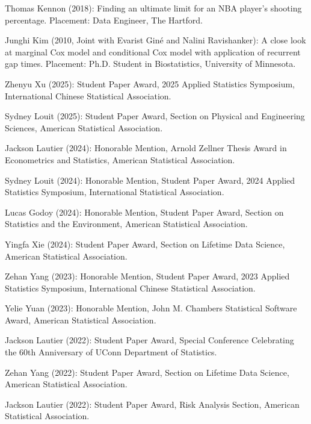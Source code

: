 \documentclass[Statistics]{vita}
\begin{document}
\begin{vita}
\begin{Students}
\begin{UndergraduateHonor}
    \item Thomas Kennon (2018): Finding an ultimate limit for an NBA player's shooting percentage. Placement: Data Engineer, The Hartford.
    \item Junghi Kim (2010, Joint with Evarist Gin\'e and Nalini Ravishanker): A close look at marginal Cox model and conditional Cox model with application of recurrent gap times. Placement: Ph.D. Student in Biostatistics, University of Minnesota.
    \end{UndergraduateHonor}
  \end{Students}
  \begin{TeachingAccomplishments}
    \begin{StudentAwards}
    \item Zhenyu Xu (2025): Student Paper Award, 2025 Applied Statistics Symposium, International Chinese Statistical Association.
    \item Sydney Louit (2025): Student Paper Award, Section on Physical and Engineering Sciences, American Statistical Association.
    \item Jackson Lautier (2024): Honorable Mention, Arnold Zellner Thesis Award in Econometrics and Statistics, American Statistical Association.
    \item Sydney Louit (2024): Honorable Mention, Student Paper Award, 2024 Applied Statistics Symposium, International Statistical Association.
    \item Lucas Godoy (2024): Honorable Mention, Student Paper Award, Section on Statistics and the Environment, American Statistical Association.
    \item Yingfa Xie (2024): Student Paper Award, Section on Lifetime Data Science, American Statistical Association.
    \item Zehan Yang (2023): Honorable Mention, Student Paper Award, 2023 Applied Statistics Symposium, International Chinese Statistical Association.
    \item Yelie Yuan (2023): Honorable Mention, John M. Chambers Statistical Software Award, American Statistical Association.
    \item Jackson Lautier (2022): Student Paper Award, Special Conference Celebrating the 60th Anniversary of UConn Department of Statistics.
    \item Zehan Yang (2022): Student Paper Award, Section on Lifetime Data Science, American Statistical Association.
    \item Jackson Lautier (2022): Student Paper Award, Risk Analysis Section, American Statistical Association.

\end{StudentAwards}
\end{TeachingAccomplishments}
\end{vita}
\end{document}
